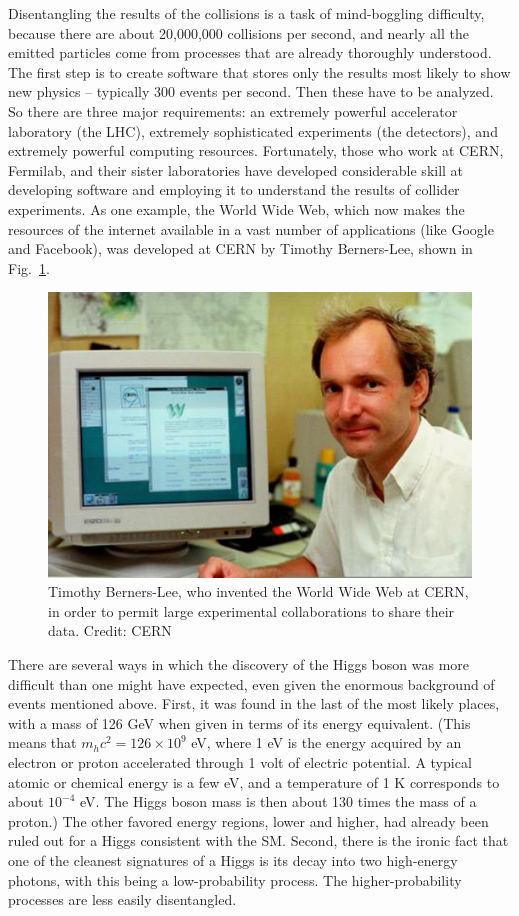 \documentclass[12pt]{iopart}
\begin{document}
Disentangling the results of the collisions is a task of mind-boggling difficulty, because there are about 20,000,000 collisions per second, and nearly all the emitted particles come from processes that are already thoroughly understood. The first step is to create software that stores only the results most likely to show new physics -- typically 300 events per second. Then these have to be analyzed. So there are three major requirements: an extremely powerful accelerator laboratory (the LHC), extremely sophisticated experiments (the detectors), and extremely powerful computing resources. Fortunately, those who work at CERN, Fermilab, and their sister laboratories have developed considerable skill at developing software and employing it to understand the results of collider experiments. As one example, the World Wide Web, which now makes the resources of the internet available in a vast number of applications (like Google and Facebook), was developed at CERN by Timothy Berners-Lee, shown in Fig.~\ref{Fig15-Berners-Lee.eps}.
\begin{figure}[htbp]
\centering
\includegraphics[bb=0 0 360 230, width=5in]{Fig15-Berners-Lee.eps}
\caption{Timothy Berners-Lee, who invented the World Wide Web at CERN, in order to permit large experimental collaborations to share their data. Credit: CERN \label{Fig15-Berners-Lee.eps}}
\end{figure}

There are several ways in which the discovery of the Higgs boson was more difficult than one might have expected, even given the enormous background of events mentioned above. First, it was found in the last of the most likely places, with a mass of 126 GeV when given in terms of its energy equivalent. (This means that $m_h c^2 = 126 \times 10^9$ eV, where 1 eV is the energy acquired by an electron or proton accelerated through 1 volt of electric potential. A typical atomic or chemical energy is a few eV, and a temperature of 1 K corresponds to about $10^{-4}$ eV. The Higgs boson mass is then about 130 times the mass of a proton.) The other favored energy regions, lower and higher, had already been ruled out for a Higgs consistent with the SM. Second, there is the ironic fact that one of the cleanest signatures of a Higgs is its decay into two high-energy photons, with this being a low-probability process. The higher-probability processes are less easily disentangled. 
\end{document}

